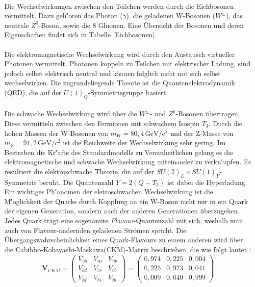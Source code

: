 \\
Die Wechselwirkungen zwischen den Teilchen werden durch die Eichbosonen vermittelt. Dazu geh\''oren das Photon ($\gamma$), die geladenen W-Bosonen ($W^{\pm}$), das neutrale $Z^{0}$-Boson, sowie die 8 Gluonen. Eine \"Ubersicht der Bosonen und deren Eigenschaften findet sich in Tabelle \ref{Eichbosonen}. \\
\\

Die elektromagnetische Wechselwirkung wird durch den Austausch virtueller Photonen vermittelt. Photonen koppeln zu Teilchen mit elektrischer Ladung, sind jedoch selbst elektrisch neutral und k\"onnen folglich nicht mit sich selbst wechselwirken. Die zugrundeliegende Theorie ist die Quantenelektrodynamik (QED), die auf der $U(1)_{Q}$-Sym\-me\-trie\-grup\-pe basiert.\\
\\
Die schwache Wechselwirkung wird \"uber die $W^{\pm}$- und $Z^{0}$-Bosonen \"ubertragen. Diese vermitteln zwischen den Fermionen mit schwachem Isospin $T_{3}$. Durch die hohen Massen der W-Bosonen von $m_{W} = 80,4\,\mathrm{GeV/c^{2}}$ und der Z-Masse von $m_{Z} = 91,2\,\mathrm{GeV/c^{2}}$ ist die Reichweite der Wechselwirkung sehr gering. Im Bestreben die Kr\''afte des Standardmodells zu Vereinheitlichen gelang es die elektromagnetische und schwache Wechselwirkung miteinander zu verkn\''upfen. Es resultiert die elektroschwache Theorie, die auf der $SU(2)_{L}\times SU(1)_{Y}$-Symmetrie beruht. Die Quantenzahl $Y = 2(Q - T_{3})$ ist dabei die Hyperladung.\\
Ein wichtiges Ph\''anomen der eletroschwachen Wechselwirkung ist die M\''oglichkeit der Quarks durch Kopplung an ein W-Boson nicht nur in ein Quark der eigenen Generation, sondern auch der anderen Generationen \"uberzugehen. Jedes Quark tr\"agt eine sogenannte \textit{Flavour}-Quantenzahl mit sich, weshalb man auch von Flavour-\"andernden geladenen Str\"omen spricht. Die \"Ubergangswahrscheinlichkeit eines Quark-Flavours zu einem anderen wird \"uber die Ca\-bibbo-\-Ko\-ba\-ya\-shi-\-Maska\-wa\-(CKM)-\-Matrix beschrieben, die wie folgt lautet \cite{pdg}:
\begin{equation}
\textbf{V}_{CKM}=\begin{pmatrix} V_{ud} & V_{us} & V_{ub} \\ V_{cd} & V_{cs} & V_{cb} \\ V_{td} & V_{ts} & V_{tb} \end{pmatrix}=\begin{pmatrix} 0,974 & 0,225 & 0,004 \\ 0,225 & 0,973 & 0,041 \\ 0,009 & 0,040 & 0,999 \end{pmatrix}
\label{CKMmatrix}
\end{equation}
